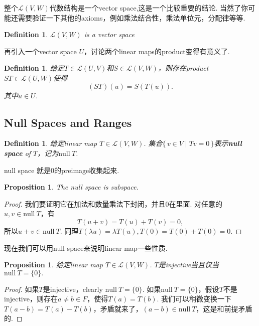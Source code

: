 \documentclass{article}
\newtheorem{proposition}[theorem]{Proposition}
\newtheorem{definition}[theorem]{Definition}
\newcommand\Set[2]{\{\,#1\mid#2\,\}} %
\newcommand\nul[1]{\text{null}\ #1}
\begin{document}
{\color{red} 整个$\mathcal{L}(V,W)$代数结构是一个vector space,这是一个比较重要的结论}. 当然了你可能还需要验证一下其他的axioms，例如乘法结合性，乘法单位元，分配律等等.

\begin{definition}
\rm $\mathcal{L}(V,W)$ is a vector space
\end{definition}

{\color{red} 再引入一个vector space $U$，讨论两个linear maps的product变得有意义了}.

\begin{definition}
给定$T \in \mathcal{L}(U,V)$和$S \in \mathcal{L}(V,W)$，则存在product $ST \in \mathcal{L}(U,W)$使得
$$
	(ST)(u) = S(T(u)).
$$
其中$u \in U$. 
\end{definition}

\newpage
\subsection{Null Spaces and Ranges}

\begin{definition}
\rm 给定linear map $T \in \mathcal{L}(V,W)$. 集合$\Set{v \in V}{Tv = 0}$表示\textbf{null space} of $T$，记为$\nul{T}$.
\end{definition}

{\color{red} null space 就是0的preimage收集起来}.

\begin{proposition}
\rm The null space is subspace.
\end{proposition}

\begin{proof}
我们要证明它在加法和数量乘法下封闭，并且$0$在里面. 对任意的$u,v \in \nul{T}$，有\[T(u+v) = T(u) + T(v) = 0,\]所以$u+v \in \nul{T}$. 同理$T(\lambda u) = \lambda T(u), T(0)=T(0)+T(0)=0$.
\end{proof}

{\color{red} 现在我们可以用null space来说明linear map一些性质}.

\begin{proposition}
\rm 给定linear map $T \in \mathcal{L}(V,W)$. $T$是injective当且仅当$\nul{T}=\{0\}.$
\end{proposition}

\begin{proof}
如果$T$是injective，clearly $\nul{T}=\{0\}$. 如果$\nul{T}=\{0\}$，假设$T$不是injective，则存在$a \neq b \in F$，使得$T(a) = T(b)$. 我们可以稍微变换一下$T(a-b) = T(a) - T(b)$，矛盾就来了，$(a - b) \in \nul{T}$，这是和前提矛盾的.
\end{proof}
\end{document}
